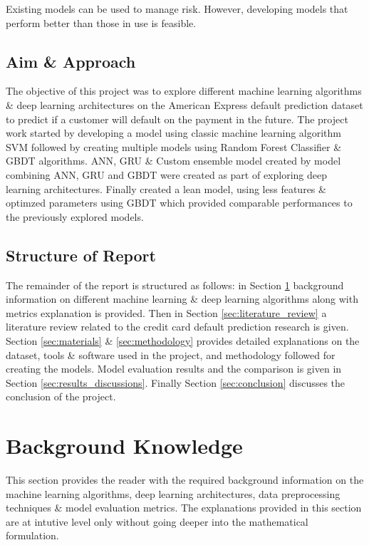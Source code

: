 \documentclass[twoside,11pt,a4paper]{article}
\begin{document}
Existing models can be used to manage risk. However, developing models that perform better than those in use is feasible.

\subsection{Aim \& Approach}
The objective of this project was to explore different machine learning algorithms \& deep learning architectures on the American Express default prediction dataset\citep{amex-default-prediction-dataset} to predict if a customer will default on the payment in the future. The project work started by developing a model using classic machine learning algorithm \acf{SVM} followed by creating multiple models using Random Forest Classifier \& \acf{GBDT} algorithms. \acf{ANN}, \acf{GRU} \& Custom ensemble model created by model combining \acs{ANN}, \acs{GRU} and \acs{GBDT} were created as part of exploring deep learning architectures. Finally created a lean model, using less features \& optimzed parameters using \acs{GBDT} which provided comparable performances to the previously explored models.

\subsection{Structure of Report}
The remainder of the report is structured as follows: in Section \ref{sec:background_knowledge} background information on different machine learning \& deep learning algorithms along with metrics explanation is provided. Then in Section \ref{sec:literature_review} a literature review related to the credit card default prediction research is given. Section \ref{sec:materials} \& \ref{sec:methodology} provides detailed explanations on the dataset, tools \& software used in the project, and methodology followed for creating the models. Model evaluation results and the comparison is given in Section \ref{sec:results_discussions}. Finally Section \ref{sec:conclusion} discusses the conclusion of the project. 
\vfill
\clearpage
\section{Background Knowledge} \label{sec:background_knowledge}
This section provides the reader with the required background information on the machine learning algorithms, deep learning architectures, data preprocessing techniques \& model evaluation metrics. The explanations provided in this section are at intutive level only without going deeper into the mathematical formulation.
\end{document}
